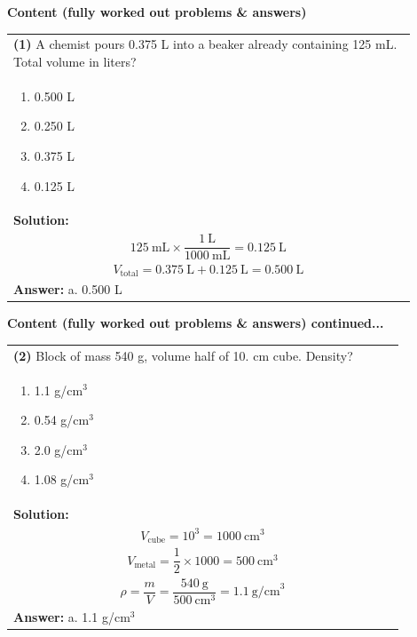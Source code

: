 \documentclass{article}
\begin{document}
\newpage
\noindent
{\large\textbf{Content (fully worked out problems \& answers)}\\[0.2em]
\begin{tabular}{|p{0.9\linewidth}|}
\hline
\vspace{0.2cm}
\textbf{(1)} A chemist pours 0.375 L into a beaker already containing 125 mL. Total volume in liters? \\
\begin{minipage}[t]{0.85\linewidth}
\begin{enumerate}[label=\alph*.]
\item 0.500 L
\item 0.250 L
\item 0.375 L
\item 0.125 L
\end{enumerate}
\end{minipage}\\
\hline
\vspace{0.2cm}
\textbf{Solution:} \\

\[
125~\text{mL} \times \frac{1~\text{L}}{1000~\text{mL}} = 0.125~\text{L}
\] \\
\[
V_\text{total} = 0.375~\text{L} + 0.125~\text{L} = 0.500~\text{L}
\] \\ 
\hline
\textbf{Answer:} a. 0.500 L \\
\hline
\end{tabular}

\newpage
\noindent
{\large\textbf{Content (fully worked out problems \& answers) continued...}}\\[0.2em]
\vspace{0.2cm}
\begin{tabular}{|p{0.9\linewidth}|}
\hline
\vspace{0.2cm}
\textbf{(2)} Block of mass 540 g, volume half of 10. cm cube. Density? \\
\begin{minipage}[t]{0.85\linewidth}
\begin{enumerate}[label=\alph*.]
   \item 1.1 g/cm$^3$
   \item 0.54 g/cm$^3$
   \item 2.0 g/cm$^3$
   \item 1.08 g/cm$^3$
\end{enumerate}
\end{minipage}\\
\hline
\vspace{0.2cm}
\textbf{Solution:} \\
\[
V_\text{cube} = 10^3 = 1000~\text{cm}^3\] \\
\[
V_\text{metal} = \frac{1}{2} \times 1000 = 500~\text{cm}^3
\] \\
\[
\rho = \frac{m}{V} = \frac{540~\text{g}}{500~\text{cm}^3} = 1.1~\text{g/cm}^3
\] \\ 
\hline
\vspace{0.2cm}
\textbf{Answer:} a. 1.1 g/cm$^3$\\
\hline
\end{tabular}

}
\end{document}
